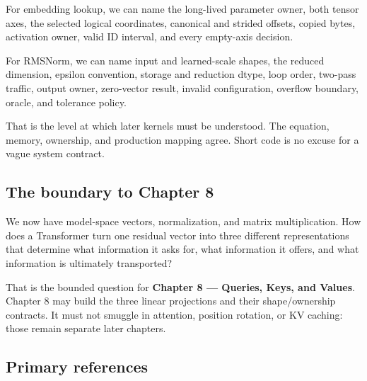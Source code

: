 \documentclass[
  10pt,
]{article}
\begin{document}
For embedding lookup, we can name the long-lived parameter owner, both
tensor axes, the selected logical coordinates, canonical and strided
offsets, copied bytes, activation owner, valid ID interval, and every
empty-axis decision.

For RMSNorm, we can name input and learned-scale shapes, the reduced
dimension, epsilon convention, storage and reduction dtype, loop order,
two-pass traffic, output owner, zero-vector result, invalid
configuration, overflow boundary, oracle, and tolerance policy.

That is the level at which later kernels must be understood. The
equation, memory, ownership, and production mapping agree. Short code is
no excuse for a vague system contract.

\subsection{The boundary to Chapter 8}\label{the-boundary-to-chapter-8}

We now have model-space vectors, normalization, and matrix
multiplication. How does a Transformer turn one residual vector into
three different representations that determine what information it asks
for, what information it offers, and what information is ultimately
transported?

That is the bounded question for \textbf{Chapter 8 --- Queries, Keys,
and Values}. Chapter 8 may build the three linear projections and their
shape/ownership contracts. It must not smuggle in attention, position
rotation, or KV caching: those remain separate later chapters.

\subsection{Primary references}\label{primary-references-2}
\end{document}
